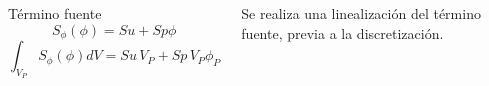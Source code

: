 \begin{frame}
\begin{columns}
            \footnotesize
            \begin{block}{\centering T\'ermino fuente}
                \begin{equation*}
                    S_{\phi}(\phi) = Su + Sp\phi
                \end{equation*}
                \begin{equation*}
                     \int_{V_{P}}S_{\phi}(\phi) dV = Su\, V_P + Sp\, V_P\phi_P
                \end{equation*}
            \end{block}                                

            Se realiza una linealizaci\'on del t\'ermino fuente, previa a la discretizaci\'on.
    \end{columns}

\end{frame}       






